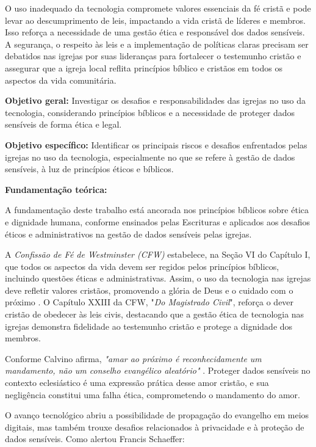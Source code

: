\documentclass[12pt,a4paper]{article}
\begin{document}
O uso inadequado da tecnologia compromete valores essenciais da fé cristã e pode levar ao descumprimento de leis, impactando a vida cristã de líderes e membros. Isso reforça a necessidade de uma gestão ética e responsável dos dados sensíveis. A segurança, o respeito às leis e a implementação de políticas claras precisam ser debatidos nas igrejas por suas lideranças para fortalecer o testemunho cristão e assegurar que a igreja local reflita princípios bíblico e cristãos em todos os aspectos da vida comunitária.

\noindent
\textbf{Objetivo geral:} Investigar os desafios e responsabilidades das igrejas no uso da tecnologia, considerando princípios bíblicos e a necessidade de proteger dados sensíveis de forma ética e legal.

\noindent
\textbf{Objetivo específico:} Identificar os principais riscos e desafios enfrentados pelas igrejas no uso da tecnologia, especialmente no que se refere à gestão de dados sensíveis, à luz de princípios éticos e bíblicos.

\noindent
\textbf{Fundamentação teórica:}

A fundamentação deste trabalho está ancorada nos princípios bíblicos sobre ética e dignidade humana, conforme ensinados pelas Escrituras e aplicados aos desafios éticos e administrativos na gestão de dados sensíveis pelas igrejas.

A \textit{Confissão de Fé de Westminster (CFW)} estabelece, na Seção VI do Capítulo I, que todos os aspectos da vida devem ser regidos pelos princípios bíblicos, incluindo questões éticas e administrativas. Assim, o uso da tecnologia nas igrejas deve refletir valores cristãos, promovendo a glória de Deus e o cuidado com o próximo \cite{cfw}. O Capítulo XXIII da CFW, "\textit{Do Magistrado Civil}", reforça o dever cristão de obedecer às leis civis, destacando que a gestão ética de tecnologia nas igrejas demonstra fidelidade ao testemunho cristão e protege a dignidade dos membros.

Conforme Calvino afirma, \textit{"amar ao próximo é reconhecidamente um mandamento, não um conselho evangélico aleatório"} \cite[p. 453]{calvino2022}. Proteger dados sensíveis no contexto eclesiástico é uma expressão prática desse amor cristão, e sua negligência constitui uma falha ética, comprometendo o mandamento do amor.

O avanço tecnológico abriu a possibilidade de propagação do evangelho em meios digitais, mas também trouxe desafios relacionados à privacidade e à proteção de dados sensíveis. Como alertou Francis Schaeffer:
\end{document}
